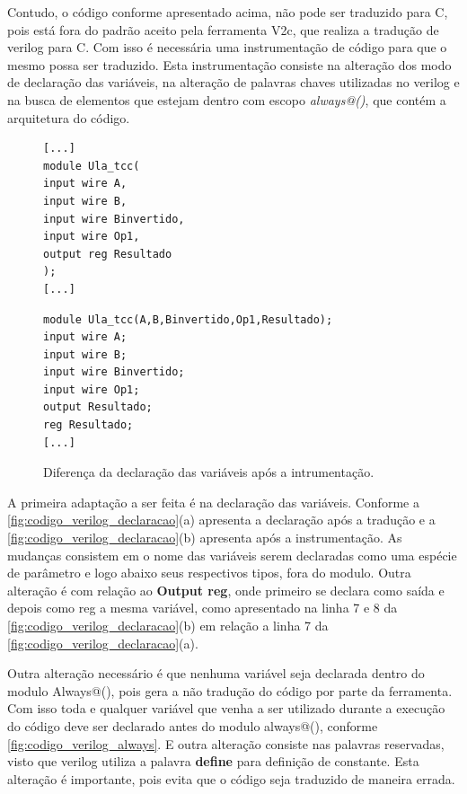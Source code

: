 \par
Contudo, o código conforme apresentado acima, não pode ser traduzido para C, pois está fora do padrão aceito pela ferramenta V2c, que realiza a tradução de verilog para C. Com isso é necessária uma instrumentação de código para que o mesmo possa ser traduzido. Esta instrumentação consiste na alteração dos modo de declaração das variáveis, na alteração de palavras chaves utilizadas no verilog e na busca de elementos que estejam dentro com escopo \textit{always@()}, que contém a arquitetura do código.

\begin{figure}[H]
\caption{\label{fig:codigo_verilog_declaracao} Diferença da declaração das variáveis após a intrumentação.}
	\begin{center}
    \begin{minipage}{0.7\textwidth}
    \begin{lstlisting}
[...]
module Ula_tcc(
input wire A,
input wire B,
input wire Binvertido,
input wire Op1,
output reg Resultado
);
[...]
    \end{lstlisting}
    \end{minipage}
    \begin{minipage}{0.7\textwidth}
    \begin{lstlisting}
module Ula_tcc(A,B,Binvertido,Op1,Resultado);
input wire A;
input wire B;
input wire Binvertido;
input wire Op1;
output Resultado;
reg Resultado;
[...]
    \end{lstlisting}
    \end{minipage}
	\end{center}
\end{figure}

\par
A primeira adaptação a ser feita é na declaração das variáveis. Conforme a \autoref{fig:codigo_verilog_declaracao}(a) apresenta a declaração após a tradução e a \autoref{fig:codigo_verilog_declaracao}(b) apresenta após a instrumentação. As mudanças consistem em o nome das variáveis serem declaradas como uma espécie de parâmetro e logo abaixo seus respectivos tipos, fora do modulo. Outra alteração é com relação ao \textbf{Output reg}, onde primeiro se declara como saída e depois como reg a mesma variável, como apresentado na linha 7 e 8 da \autoref{fig:codigo_verilog_declaracao}(b) em relação a linha 7 da \autoref{fig:codigo_verilog_declaracao}(a). 

\par
Outra alteração necessário é que nenhuma variável seja declarada dentro do modulo Always@(), pois gera a não tradução do código por parte da ferramenta. Com isso toda e qualquer variável que venha a ser utilizado durante a execução do código deve ser declarado antes do modulo always@(), conforme \autoref{fig:codigo_verilog_always}. E outra alteração consiste nas palavras reservadas, visto que verilog utiliza a palavra \textbf{define} para definição de constante. Esta alteração é importante, pois evita que o código seja traduzido de maneira errada. 

